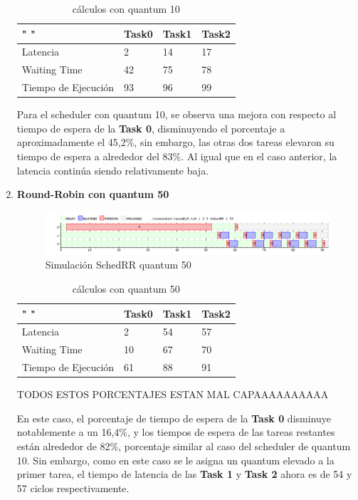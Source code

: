 \documentclass[11pt]{article}
\begin{document}
\begin{enumerate}
\begin{table}[htb]
\centering
\begin{tabular}{| l | l | l | l |}
\hline
" " & Task0 & Task1 & Task2 \\
\hline \hline
Latencia & 2 & 14 & 17 \\ \hline
Waiting Time & 42 & 75 & 78 \\ \hline
Tiempo de Ejecución & 93 & 96 & 99 \\ \hline
\end{tabular}
\caption{cálculos con quantum 10}
\end{table}

Para el scheduler con quantum 10, se observa una mejora con respecto al tiempo de espera de la \textbf{Task 0}, disminuyendo el porcentaje a aproximadamente el 45,2\%, sin embargo, las otras dos tareas elevaron su tiempo de espera a alrededor del 83\%. Al igual que en el caso anterior, la latencia continúa siendo relativamente baja.

\item \textbf{Round-Robin con quantum 50}

      \begin{figure}[H]
        \includegraphics[scale=0.5]{Ej5q50}
        \caption{Simulación SchedRR quantum 50}
      \end{figure}

\begin{table}[htb]
\centering
\begin{tabular}{| l | l | l | l |}
\hline
" " & Task0 & Task1 & Task2 \\
\hline \hline
Latencia & 2 & 54 & 57 \\ \hline
Waiting Time & 10 & 67 & 70 \\ \hline
Tiempo de Ejecución & 61 & 88 & 91 \\ \hline
\end{tabular}
\caption{cálculos con quantum 50}
\end{table}

TODOS ESTOS PORCENTAJES ESTAN MAL CAPAAAAAAAAAA

En este caso, el porcentaje de tiempo de espera de la \textbf{Task 0} disminuye notablemente a un 16,4\%, y los tiempos de espera de las tareas restantes están alrededor de 82\%, porcentaje similar al caso del scheduler de quantum 10. Sin embargo, como en este caso se le asigna un quantum elevado a la primer tarea, el tiempo de latencia de las \textbf{Task 1} y \textbf{Task 2} ahora es de 54 y 57 ciclos respectivamente. 
\end{enumerate}
\end{document}
